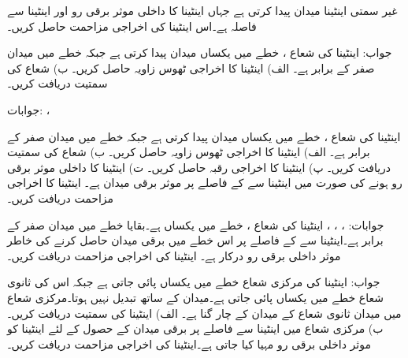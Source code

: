 \newpage
{}

غیر سمتی اینٹینا  میدان پیدا کرتی ہے جہاں اینٹینا کا داخلی موثر برقی رو  اور اینٹینا سے فاصلہ  ہے۔اس اینٹینا کی اخراجی مزاحمت حاصل کریں۔

جواب:
اینٹینا کی شعاع ،  خطے میں یکساں میدان پیدا کرتی ہے جبکہ  خطے میں میدان صفر کے برابر ہے۔ الف) اینٹینا کا اخراجی ٹھوس زاویہ  حاصل کریں۔ ب) شعاع کی سمتیت  دریافت کریں۔

جوابات: ، 

اینٹینا کی شعاع ،  خطے میں یکساں میدان پیدا کرتی ہے جبکہ  خطے میں میدان صفر کے برابر ہے۔ الف) اینٹینا کا اخراجی ٹھوس زاویہ  حاصل کریں۔ ب) شعاع کی سمتیت  دریافت کریں۔ پ) اینٹینا کا اخراجی رقبہ  حاصل کریں۔ ت) اینٹینا کا داخلی موثر برقی رو  ہونے کی صورت میں اینٹینا سے  کے فاصلے پر موثر برقی 
میدان  ہے۔ اینٹینا کا اخراجی مزاحمت  دریافت کریں۔



جوابات: ، ، ، 
اینٹینا کی شعاع ،  خطے میں یکساں ہے۔بقایا خطے میں میدان صفر کے برابر ہے۔اینٹینا سے  کے فاصلے پر اس خطے میں  برقی میدان حاصل کرنے کی خاطر  موثر داخلی برقی رو درکار ہے۔ اینٹینا کی اخراجی مزاحمت  دریافت کریں۔

جواب:
اینٹینا کی مرکزی شعاع   خطے میں یکساں پائی جاتی ہے جبکہ اس کی ثانوی شعاع  خطے میں یکساں پائی جاتی ہے۔میدان  کے ساتھ تبدیل نہیں ہوتا۔مرکزی شعاع میں میدان ثانوی شعاع کے میدان کے چار گنا ہے۔ الف) اینٹینا کی سمتیت  دریافت کریں۔ب) مرکزی شعاع میں اینٹینا سے  فاصلے پر  برقی میدان کے حصول کے لئے اینٹینا کو   موثر داخلی برقی رو مہیا کیا جاتی ہے۔اینٹینا کی اخراجی مزاحمت  دریافت کریں۔

